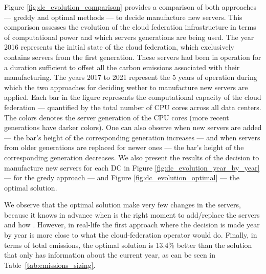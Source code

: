 Figure \ref{fig:dc_evolution_comparison} provides a comparison of both approaches --- greddy and optimal methods --- to decide manufacture new servers.   This comparison assesses the evolution of the cloud federation infrastructure in terms of computational power and which servers generations are being used. The year 2016 represents the initial state of the cloud federation, which exclusively contains servers from the first generation. These servers had been in operation for a duration sufficient to offset all the carbon emissions associated with their manufacturing. The years 2017 to 2021 represent the 5 years of operation during which the two approaches for deciding wether to manufacture new servers are applied. Each bar in the figure represents the computational capacity of the cloud federation --- quantified by the total number of CPU cores across all data centers. The colors denotes the server generation of the CPU cores  (more recent generations have darker colors). One can also observe when new servers are added ---  the bar's height of the corresponding generation increases --- and when servers from older generations are replaced for newer ones ---  the bar's height of the corresponding generation decreases. We also present the results of the decision to manufacture new servers for each DC in Figure \ref{fig:dc_evolution_year_by_year} --- for the gredy approach --- and Figure \ref{fig:dc_evolution_optimal} ---  the optimal solution.

We observe that the optimal solution make very few changes in the servers, because it knows in advance when is the right moment to add/replace the servers and how . However, in real-life the first approach where the decision is made year by year is more close to what the cloud-federation operator would do. Finally, in terms of total  emissions, the optimal solution is 13.4\% better than the solution that only has information about the current year, as can be seen in Table~\ref{tab:emissions_sizing}.

